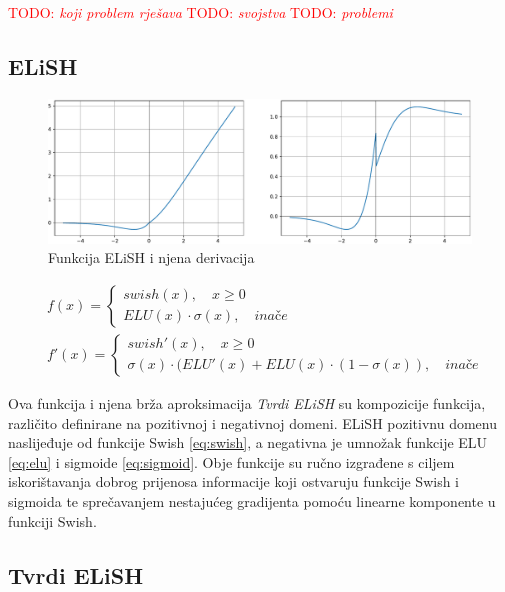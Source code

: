 \documentclass[times, utf8, numeric, diplomski]{fer}
\def\otherwise{\textit{inače}}
\def\TODO#1{\noindent\textcolor{red}{TODO: \textit{#1}}\newline}
\def\todo#1{\TODO{#1}}
\begin{document}
\todo{koji problem rješava}
\todo{svojstva}
\todo{problemi}

\subsection{ELiSH}
\label{func:elish}

\begin{figure}[H]
\includegraphics[width=\textwidth]{ELiSH.pdf}
\centering
\caption{Funkcija ELiSH i njena derivacija}
\label{fig:elish}
\end{figure}

\begin{equation}
\begin{split}
&f(x) = 
	\begin{cases}
		swish(x), \quad x \geq 0 \\
		ELU(x) \cdot \sigma(x), \quad \otherwise
	\end{cases} \\
&f'(x) =
	\begin{cases}
		swish'(x), \quad x \geq 0 \\
		\sigma(x) \cdot (ELU'(x) + ELU(x) \cdot (1-\sigma(x)), \quad \otherwise
	\end{cases}
\end{split}
\end{equation}

Ova funkcija i njena brža aproksimacija \textit{Tvrdi ELiSH} su kompozicije funkcija, različito definirane na pozitivnoj i negativnoj domeni. ELiSH pozitivnu domenu naslijeđuje od funkcije Swish \eqref{eq:swish}, a negativna je umnožak funkcije ELU \eqref{eq:elu} i sigmoide \eqref{eq:sigmoid}. Obje funkcije su ručno izgrađene s ciljem iskorištavanja dobrog prijenosa informacije koji ostvaruju funkcije Swish i sigmoida te sprečavanjem nestajućeg gradijenta pomoću linearne komponente u funkciji Swish. \citep{elish}

\subsection{Tvrdi ELiSH}
\label{func:hard_elish}
\end{document}
